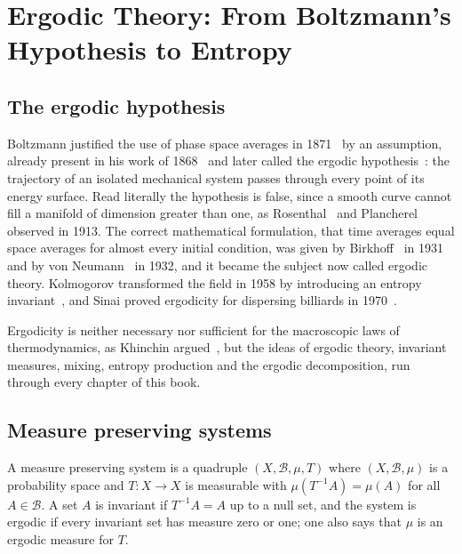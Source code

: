 \chapter{Ergodic Theory: From Boltzmann's Hypothesis to Entropy}
\label{ch:ergodic}

\section{The ergodic hypothesis}

Boltzmann justified the use of phase space averages in 1871~\cite{boltzmann1871} by an assumption, already present in his work of 1868~\cite{boltzmann1868} and later called the ergodic hypothesis~\cite{ehrenfest1911}: the trajectory of an isolated mechanical system passes through every point of its energy surface. Read literally the hypothesis is false, since a smooth curve cannot fill a manifold of dimension greater than one, as Rosenthal~\cite{rosenthal1913} and Plancherel~\cite{plancherel1913} observed in 1913. The correct mathematical formulation, that time averages equal space averages for almost every initial condition, was given by Birkhoff~\cite{birkhoff1931} in 1931 and by von Neumann~\cite{vonneumann1932ergodic} in 1932, and it became the subject now called ergodic theory. Kolmogorov transformed the field in 1958 by introducing an entropy invariant~\cite{kolmogorov1958}, and Sinai proved ergodicity for dispersing billiards in 1970~\cite{sinai1970}.

Ergodicity is neither necessary nor sufficient for the macroscopic laws of thermodynamics, as Khinchin argued~\cite{khinchin1949}, but the ideas of ergodic theory, invariant measures, mixing, entropy production and the ergodic decomposition, run through every chapter of this book.

\section{Measure preserving systems}

\begin{definition}
\label{def:ergodic}
A measure preserving system is a quadruple $(X,\mathcal{B},\mu,T)$ where $(X,\mathcal{B},\mu)$ is a probability space and $T:X\to X$ is measurable with $\mu(T^{-1}A) = \mu(A)$ for all $A\in\mathcal{B}$. A set $A$ is invariant if $T^{-1}A = A$ up to a null set, and the system is ergodic if every invariant set has measure zero or one; one also says that $\mu$ is an ergodic measure for $T$.
\end{definition}

